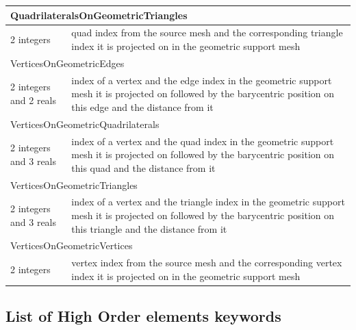 \documentclass[a4paper,12pt]{article}
\begin{document}
\begin{longtable}{|m{4cm}|m{11cm}|}
\multicolumn{2}{|l|}{QuadrilateralsOnGeometricTriangles} \\
\hline
2 integers & quad index from the source mesh and the corresponding triangle index it is projected on in the geometric support mesh \\
\hline\hline

\multicolumn{2}{|l|}{VerticesOnGeometricEdges} \\
\hline
2 integers and 2 reals & index of a vertex and the edge index in the geometric support mesh it is projected on followed by the barycentric position on this edge and the distance from it \\
\hline\hline

\multicolumn{2}{|l|}{VerticesOnGeometricQuadrilaterals} \\
\hline
2 integers and 3 reals & index of a vertex and the quad index in the geometric support mesh it is projected on followed by the barycentric position on this quad and the distance from it \\
\hline\hline

\multicolumn{2}{|l|}{VerticesOnGeometricTriangles} \\
\hline
2 integers and 3 reals & index of a vertex and the triangle index in the geometric support mesh it is projected on followed by the barycentric position on this triangle and the distance from it \\
\hline\hline

\multicolumn{2}{|l|}{VerticesOnGeometricVertices} \\
\hline
2 integers & vertex index from the source mesh and the corresponding vertex index it is projected on in the geometric support mesh \\
\hline

\end{longtable}



\subsection{List of High Order elements keywords}
\end{document}
